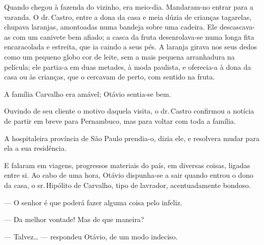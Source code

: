 {Quando chegou à fazenda do vizinho, era meio-dia.
Mandaram-no entrar para a varanda. O dr.\,Castro, entre a dona da casa e
meia dúzia de crianças tagarelas, chupava laranjas, amontoadas
numa bandeja sobre uma cadeira. Ele descascava-as com um canivete bem
afiado; a casca da fruta desenrolava-se numa longa fita encaracolada e
estreita, que ia caindo a seus pés. A laranja girava nos seus
dedos como um pequeno globo cor de leite, sem
a mais pequena arranhadura na película; ele partia-a em duas metades, à
moda paulista, e oferecia-a à dona da casa ou às crianças, que o
cercavam de perto, com sentido na fruta.


A família Carvalho era amável; Otávio
sentia-se bem.

Ouvindo de seu cliente o motivo daquela visita, o dr.\,Castro
confirmou a notícia de partir em breve para Pernambuco, mas
para voltar com toda a família.

A hospitaleira província de São Paulo prendia-o, dizia
ele, e resolvera mudar para ela a sua residência.

E falaram em viagens, progressos materiais do país, em diversas
coisas, ligadas entre si. Ao cabo de uma hora, Otávio
dispunha-se a sair quando entrou o dono da casa, o sr.\,Hipólito de
Carvalho, tipo de lavrador, acentuadamente bondoso.


--- O senhor é que poderá fazer alguma coisa pelo infeliz.

--- Da melhor vontade! Mas de que maneira?


--- Talvez\ldots{} --- respondeu Otávio, de um
modo indeciso.


}
